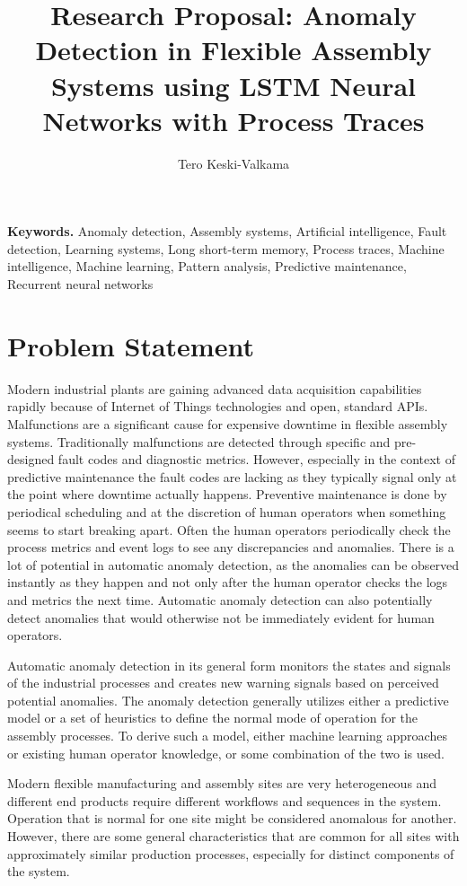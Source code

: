 \documentclass[a4paper,10pt]{article}
\title{Research Proposal: Anomaly Detection in Flexible Assembly Systems using LSTM Neural Networks with Process Traces}
\author{Tero Keski-Valkama}
\begin{document}
\maketitle

\smallskip
\noindent \textbf{Keywords.} Anomaly detection, Assembly systems, Artificial intelligence, Fault detection, Learning systems, Long short-term memory,
Process traces, Machine intelligence, Machine learning, Pattern analysis, Predictive maintenance, Recurrent neural networks

\tableofcontents

\section{Problem Statement}

Modern industrial plants are gaining advanced data acquisition capabilities rapidly because of Internet of Things technologies and open, standard APIs.
Malfunctions are a significant cause for expensive downtime in flexible assembly systems. Traditionally malfunctions are detected through specific and pre-designed fault codes
and diagnostic metrics. However, especially in the context of predictive maintenance the fault codes are lacking as they typically signal only at the point where downtime
actually happens. Preventive maintenance is done by periodical scheduling and at the discretion of human operators when something seems to start breaking apart.
Often the human operators periodically check the process metrics and event logs to see any discrepancies and anomalies. There is a lot of potential in automatic anomaly
detection, as the anomalies can be observed instantly as they happen and not only after the human operator checks the logs and metrics the next time. Automatic
anomaly detection can also potentially detect anomalies that would otherwise not be immediately evident for human operators.

Automatic anomaly detection in its general form monitors the states and signals of the industrial processes and creates new warning signals based on perceived potential anomalies.
The anomaly detection generally utilizes either a predictive model or a set of heuristics to define the normal mode of operation for the assembly processes. To derive such a model,
either machine learning approaches or existing human operator knowledge, or some combination of the two is used.

Modern flexible manufacturing and assembly sites are very heterogeneous and different end products require different workflows and sequences in the system. Operation that is normal
for one site might be considered anomalous for another. However, there are some general characteristics that are common for all sites with approximately similar
production processes, especially for distinct components of the system.
\end{document}
